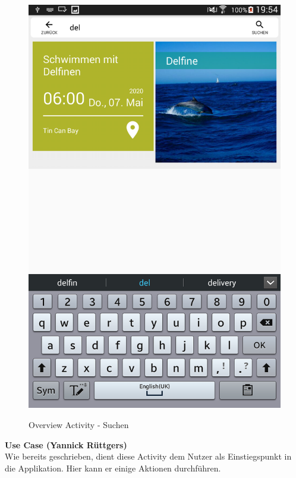 \begin{figure}[H]
\centering
\begin{minipage}[t]{1\textwidth} %
\caption{Overview Activity - Suchen} %
\includegraphics[width=1\textwidth]{img/Suchen}\\ %
\end{minipage}
\end{figure}

\textbf{Use Case (Yannick Rüttgers)}\\
Wie bereits geschrieben, dient diese Activity dem Nutzer als Einstiegspunkt in die Applikation. Hier kann er einige Aktionen durchführen.
 
